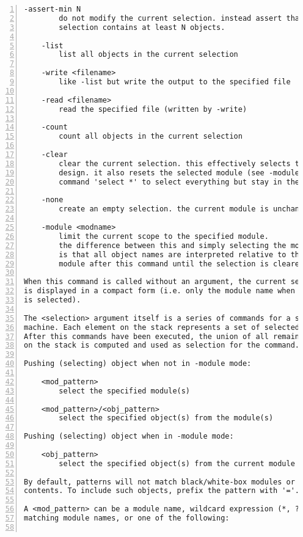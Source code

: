 \begin{lstlisting}[numbers=left,frame=single]
    -assert-min N
        do not modify the current selection. instead assert that the given
        selection contains at least N objects.

    -list
        list all objects in the current selection

    -write <filename>
        like -list but write the output to the specified file

    -read <filename>
        read the specified file (written by -write)

    -count
        count all objects in the current selection

    -clear
        clear the current selection. this effectively selects the whole
        design. it also resets the selected module (see -module). use the
        command 'select *' to select everything but stay in the current module.

    -none
        create an empty selection. the current module is unchanged.

    -module <modname>
        limit the current scope to the specified module.
        the difference between this and simply selecting the module
        is that all object names are interpreted relative to this
        module after this command until the selection is cleared again.

When this command is called without an argument, the current selection
is displayed in a compact form (i.e. only the module name when a whole module
is selected).

The <selection> argument itself is a series of commands for a simple stack
machine. Each element on the stack represents a set of selected objects.
After this commands have been executed, the union of all remaining sets
on the stack is computed and used as selection for the command.

Pushing (selecting) object when not in -module mode:

    <mod_pattern>
        select the specified module(s)

    <mod_pattern>/<obj_pattern>
        select the specified object(s) from the module(s)

Pushing (selecting) object when in -module mode:

    <obj_pattern>
        select the specified object(s) from the current module

By default, patterns will not match black/white-box modules or their
contents. To include such objects, prefix the pattern with '='.

A <mod_pattern> can be a module name, wildcard expression (*, ?, [..])
matching module names, or one of the following:


\end{lstlisting}
